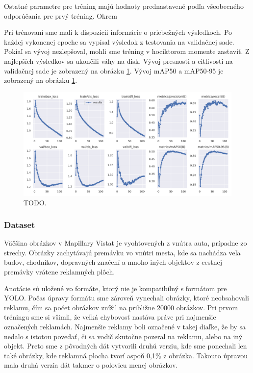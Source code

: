 Ostatné parametre pre tréning majú hodnoty prednastavené podľa všeobecného odporúčania pre prvý tréning. Okrem 

Pri trénovaní sme mali k dispozícii informácie o priebežných výsledkoch. Po každej vykonenej epoche sa vypísal výsledok z testovania na validačnej sade. Pokiaľ sa vývoj nezlepšoval, mohli sme tréning v hociktorom momente zastaviť. Z najlepších výsledkov sa ukončili váhy na disk. Vývoj presnosti a citlivosti na validačnej sade je zobrazený na obrázku \ref{img:lab}. Vývoj mAP50 a mAP50-95 je zobrazený na obrázku \ref{img:lab}.
\\
\begin{figure}[ht]
    \centering
    \includegraphics[width=1\textwidth]{images/04/graf.png}
    \caption{TODO.}
    \label{img:lab}
\end{figure}

\subsubsection{Dataset}

Väčšina obrázkov v Mapillary Vistat je vyohtovených z vnútra auta, prípadne zo strechy. Obrázky zachytávajú premávku vo vnútri mesta, kde sa nachádza veľa budov, chodníkov, dopravných značení a mnoho iných objektov z cestnej premávky vrátene reklamných plôch.

Anotácie sú uložené vo formáte, ktorý nie je kompatibilný s formátom pre YOLO. Počas úpravy formátu sme zároveň vynechali obrázky, ktoré neobsahovali reklamu, čím sa počet obrázkov znížil na približne 20000 obrázkov. Pri prvom tréningu sme si všimli, že veľká chybovosť nastáva práve pri najmenšie označených reklamách. Najmenšie reklamy boli označené v takej diaľke, že by sa nedalo s istotou povedať, či sa vodič skutočne pozeral na reklamu, alebo na iný objekt. Preto sme z pôvodných dát vytvorili druhú verziu, kde sme ponechali len také obrázky, kde reklamná plocha tvorí aspoň 0,1\% z obrázka. Takouto úpravou mala druhá verzia dát takmer o polovicu menej obrázkov.

